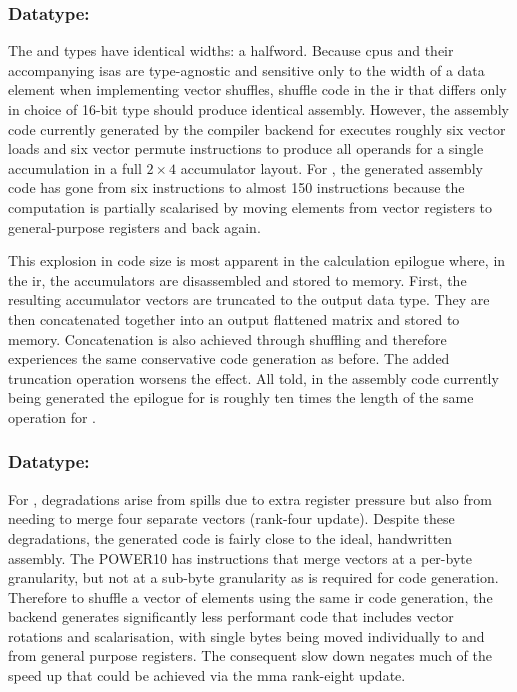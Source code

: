 \documentclass[\main/thesis.tex]{subfiles}
\begin{document}
\subsubsection{Datatype: \texorpdfstring{}{half}}
\label{sec:halfShuffle}
The  and  types have identical widths: a halfword.
Because \glspl{cpu} and their accompanying \glspl{isa} are type-agnostic and sensitive only to the width of a data element when implementing vector shuffles, shuffle code in the \gls{ir} that differs only in choice of 16-bit type should produce identical assembly.
However, the assembly code currently generated  by the compiler backend  for  executes roughly six vector loads and six vector permute instructions to produce all operands for a single accumulation in a full $2 \times 4$ accumulator layout.
For , the generated assembly code has gone from six instructions to almost 150 instructions because the computation is partially scalarised by moving elements from vector registers to general-purpose registers and back again.

This explosion in code size is most apparent in the calculation epilogue where, in the \gls{ir}, the accumulators are disassembled and stored to memory.
First, the resulting accumulator vectors are truncated to the output data type.
They are then concatenated together into an output flattened matrix and stored to memory.
Concatenation is also achieved through shuffling and therefore experiences the same conservative code generation as before.
The added truncation operation worsens the effect.
All told, in the assembly code currently being generated the epilogue for  is roughly ten times the length of the same operation for .

\subsubsection{Datatype: \texorpdfstring{}{i4}}
For , degradations arise from \glspl{spill} due to extra register pressure but also from needing to merge four separate vectors (rank-four update).
Despite these degradations, the generated code is fairly close to the ideal, handwritten assembly.
The POWER10 has instructions that merge vectors at a per-byte granularity, but not at a sub-byte granularity as is required for  code generation.
Therefore to shuffle a vector of  elements using the same \gls{ir} code generation, the backend generates significantly less performant code that includes vector rotations and scalarisation, with single bytes being moved individually to and from general purpose registers.
The consequent slow down negates much of the speed up that could be achieved via the \gls{mma} rank-eight update.
\end{document}
